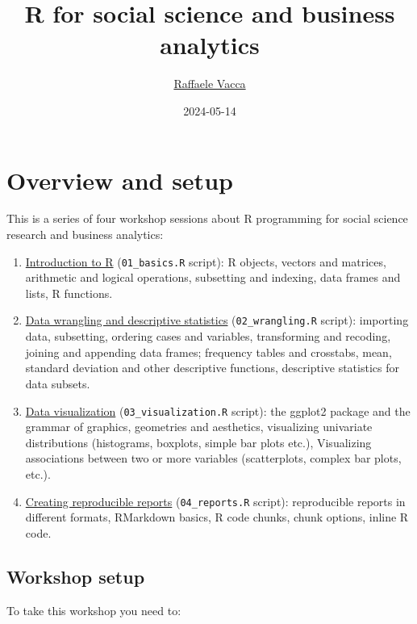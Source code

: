 \documentclass[
]{book}
\title{R for social science and business analytics}
\author{\href{http://www.raffaelevacca.com/}{Raffaele Vacca}}
\date{2024-05-14}
\providecommand{\tightlist}{%
  \setlength{\itemsep}{0pt}\setlength{\parskip}{0pt}}
\begin{document}
\maketitle

{
\setcounter{tocdepth}{1}
\tableofcontents
}
\hypertarget{overview-and-setup}{%
\chapter{Overview and setup}\label{overview-and-setup}}

This is a series of four workshop sessions about R programming for social science research and business analytics:

\begin{enumerate}
\def\labelenumi{\arabic{enumi}.}
\tightlist
\item
  \protect\hyperlink{intro}{Introduction to R} (\texttt{01\_basics.R} script): R objects, vectors and matrices, arithmetic and logical operations, subsetting and indexing, data frames and lists, R functions.
\item
  \protect\hyperlink{wrangling}{Data wrangling and descriptive statistics} (\texttt{02\_wrangling.R} script): importing data, subsetting, ordering cases and variables, transforming and recoding, joining and appending data frames; frequency tables and crosstabs, mean, standard deviation and other descriptive functions, descriptive statistics for data subsets.
\item
  \protect\hyperlink{visualization}{Data visualization} (\texttt{03\_visualization.R} script): the ggplot2 package and the grammar of graphics, geometries and aesthetics, visualizing univariate distributions (histograms, boxplots, simple bar plots etc.), Visualizing associations between two or more variables (scatterplots, complex bar plots, etc.).
\item
  \protect\hyperlink{reproducible}{Creating reproducible reports} (\texttt{04\_reports.R} script): reproducible reports in different formats, RMarkdown basics, R code chunks, chunk options, inline R code.
\end{enumerate}

\hypertarget{setup}{%
\section{Workshop setup}\label{setup}}

To take this workshop you need to:
\end{document}
